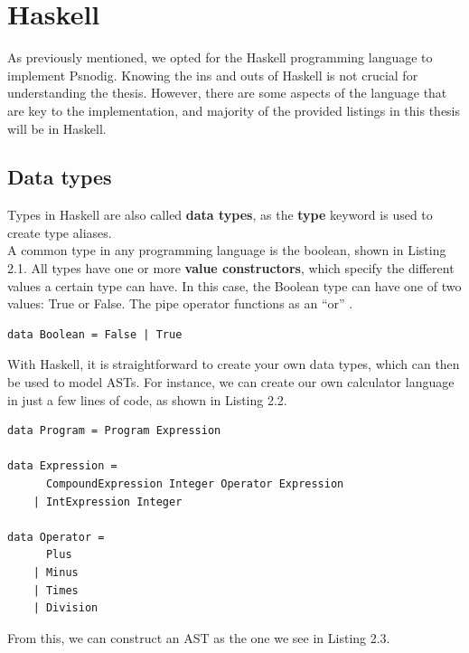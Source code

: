 \section{Haskell}

As previously mentioned, we opted for the Haskell programming language to implement Psnodig. Knowing the ins and outs of Haskell is not crucial for understanding the thesis. However, there are some aspects of the language that are key to the implementation, and majority of the provided listings in this thesis will be in Haskell.

\subsection{Data types}

Types in Haskell are also called \textbf{data types}, as the \textbf{type} keyword is used to create type aliases. \hfill \\

A common type in any programming language is the boolean, shown in Listing 2.1. All types have one or more \textbf{value constructors}, which specify the different values a certain type can have. In this case, the Boolean type can have one of two values: True or False. The pipe operator functions as an ``or'' \cite[be stian om å sjekke hvilken side dette eksemplet er på i boka]{LYAH}. \hfill \\

\begin{lstlisting}[caption={Recreating the Boolean data type with Haskell}, captionpos=b]
data Boolean = False | True
\end{lstlisting}

With Haskell, it is straightforward to create your own data types, which can then be used to model ASTs. For instance, we can create our own calculator language in just a few lines of code, as shown in Listing 2.2. \hfill \\

\begin{lstlisting}[caption={Example data types in Haskell}, captionpos=b]
data Program = Program Expression

data Expression =
      CompoundExpression Integer Operator Expression
    | IntExpression Integer

data Operator =
      Plus
    | Minus
    | Times
    | Division
\end{lstlisting}

From this, we can construct an AST as the one we see in Listing 2.3. \hfill \\

